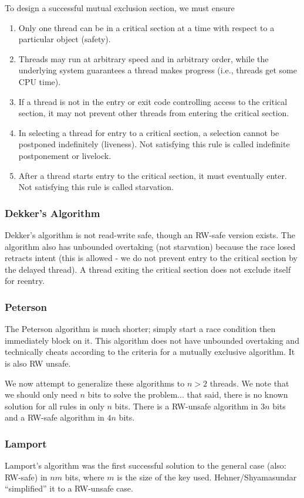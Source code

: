 \documentclass[12pt]{article}
\begin{document}
To design a successful mutual exclusion section, we must ensure
\begin{enumerate}
\item Only one thread can be in a critical section at a time with respect to a particular object (safety).
\item Threads may run at arbitrary speed and in arbitrary order, while the underlying system guarantees a thread makes progress (i.e., threads get some CPU time).
\item If a thread is not in the entry or exit code controlling access to the critical section, it may not prevent other threads from entering the critical section.
\item In selecting a thread for entry to a critical section, a selection cannot be postponed indefinitely (liveness). Not satisfying this rule is called indefinite postponement or livelock.
\item After a thread starts entry to the critical section, it must eventually enter. Not satisfying this rule is called starvation.
\end{enumerate}

\subsubsection{Dekker's Algorithm}
Dekker's algorithm is not read-write safe, though an RW-safe version exists. The algorithm also has unbounded overtaking (not starvation) because the race losed retracts intent (this is allowed - we do not prevent entry to the critical section by the delayed thread). A thread exiting the critical section does not exclude itself for reentry.

\subsubsection{Peterson}
The Peterson algorithm is much shorter; simply start a race condition then immediately block on it. This algorithm does not have unbounded overtaking and technically cheats according to the criteria for a mutually exclusive algorithm. It is also RW unsafe.

We now attempt to generalize these algorithms to $n > 2$ threads. We note that we should only need $n$ bits to solve the problem... that said, there is no known solution for all rules in only $n$ bits. There is a RW-unsafe algorithm in $3n$ bits and a RW-safe algorithm in $4n$ bits.

\subsubsection{Lamport}
Lamport's algorithm was the first successful solution to the general case (also: RW-safe) in $nm$ bits, where $m$ is the size of the key used. Hehner/Shyamasundar ``simplified'' it to a RW-unsafe case.
\end{document}
